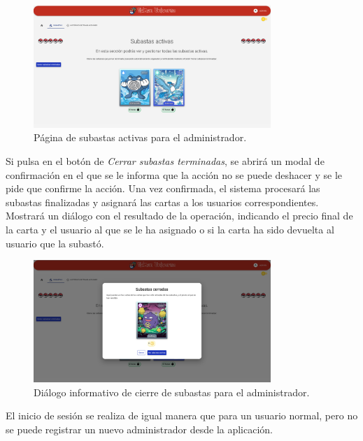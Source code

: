 \begin{figure}[H]
    \centering
    \includegraphics[width=0.8\textwidth]{figures/6-Analisis/6-Interfaz/interfaz/subastas-admin.png}
    \caption{Página de subastas activas para el administrador.}
    \label{fig:m-interfaz-admin-subastas}
\end{figure}

Si pulsa en el botón de \textit{Cerrar subastas terminadas}, se abrirá un modal de confirmación en el que se 
le informa que la acción no se puede deshacer y se le pide que confirme la acción.
Una vez confirmada, el sistema procesará las subastas finalizadas y asignará las cartas a los usuarios correspondientes.
Mostrará un diálogo con el resultado de la operación, indicando el precio final de la carta y el usuario al que se le ha asignado o 
si la carta ha sido devuelta al usuario que la subastó.

\begin{figure}[H]
    \centering
    \includegraphics[width=0.8\textwidth]{figures/6-Analisis/6-Interfaz/interfaz/subastas-admin-cierre.png}
    \caption{Diálogo informativo de cierre de subastas para el administrador.}
    \label{fig:m-interfaz-cerrar-subastas}
\end{figure}

El inicio de sesión se realiza de igual manera que para un usuario normal, pero no se puede registrar un nuevo administrador desde la aplicación.







